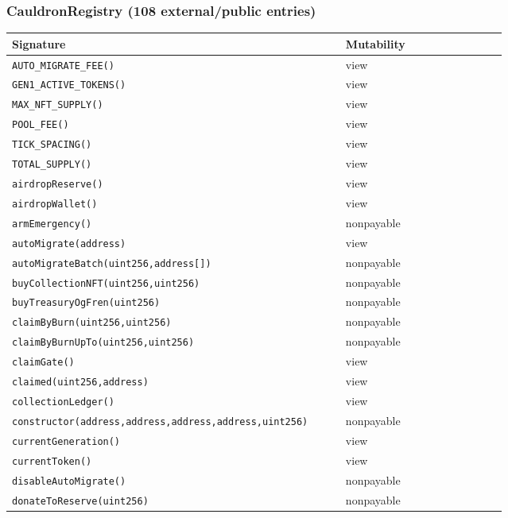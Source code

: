 \subsubsection*{CauldronRegistry \;\normalfont\small(108 external/public entries)}
\begin{longtable}{@{}p{0.62\linewidth}p{0.30\linewidth}@{}}
\toprule \textbf{Signature} & \textbf{Mutability} \\ \midrule \endhead
\texttt{\scriptsize AUTO\_MIGRATE\_FEE()} & view \\
\texttt{\scriptsize GEN1\_ACTIVE\_TOKENS()} & view \\
\texttt{\scriptsize MAX\_NFT\_SUPPLY()} & view \\
\texttt{\scriptsize POOL\_FEE()} & view \\
\texttt{\scriptsize TICK\_SPACING()} & view \\
\texttt{\scriptsize TOTAL\_SUPPLY()} & view \\
\texttt{\scriptsize airdropReserve()} & view \\
\texttt{\scriptsize airdropWallet()} & view \\
\texttt{\scriptsize armEmergency()} & nonpayable \\
\texttt{\scriptsize autoMigrate(address)} & view \\
\texttt{\scriptsize autoMigrateBatch(uint256,address[])} & nonpayable \\
\texttt{\scriptsize buyCollectionNFT(uint256,uint256)} & nonpayable \\
\texttt{\scriptsize buyTreasuryOgFren(uint256)} & nonpayable \\
\texttt{\scriptsize claimByBurn(uint256,uint256)} & nonpayable \\
\texttt{\scriptsize claimByBurnUpTo(uint256,uint256)} & nonpayable \\
\texttt{\scriptsize claimGate()} & view \\
\texttt{\scriptsize claimed(uint256,address)} & view \\
\texttt{\scriptsize collectionLedger()} & view \\
\texttt{\scriptsize constructor(address,address,address,address,uint256)} & nonpayable \\
\texttt{\scriptsize currentGeneration()} & view \\
\texttt{\scriptsize currentToken()} & view \\
\texttt{\scriptsize disableAutoMigrate()} & nonpayable \\
\texttt{\scriptsize donateToReserve(uint256)} & nonpayable \\

\end{longtable}
